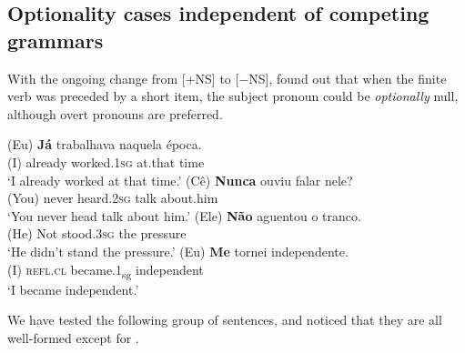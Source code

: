\documentclass[output=paper,colorlinks,citecolor=brown]{langscibook}
\begin{document}
\subsection{Optionality cases independent of competing grammars}

With the ongoing change from [+NS] to [$-$NS], \citet{duarte1995} found out that when the finite verb was preceded by a short item, the subject pronoun could be \emph{optionally} null, although overt pronouns are preferred.

\ea\label{ex:03:kato:19} %
   \ea\label{ex:03:kato:19a}
 \gll (Eu) \textbf{Já}       trabalhava   naquela época.\\
             (I)   already worked.1\textsc{sg} at.that   time \\
            \glt ‘I already worked at that time.’
   \ex\label{ex:03:kato:19b}\gll (Cê)     \textbf{Nunca}  ouviu       falar     nele?\footnotemark{}\\
             (You) never    heard.2\textsc{sg}  talk  about.him\\
            \glt ‘You never head talk about him.’
   \ex\label{ex:03:kato:19c}
 \gll (Ele) \textbf{Não} aguentou o   tranco. \\
            (He) Not stood.3\textsc{sg}   the pressure\\
            \glt ‘He didn't stand the pressure.’
   \ex\label{ex:03:kato:19d}
 \gll (Eu) \textbf{Me}   tornei      independente.\\
             (I)  \textsc{refl}.\textsc{cl} became.1\textsubscript{sg} independent\\
            \glt ‘I became independent.’

   \z

\z
{}

We have tested the following group of sentences, and noticed that they are all well-formed except for .
\end{document}
